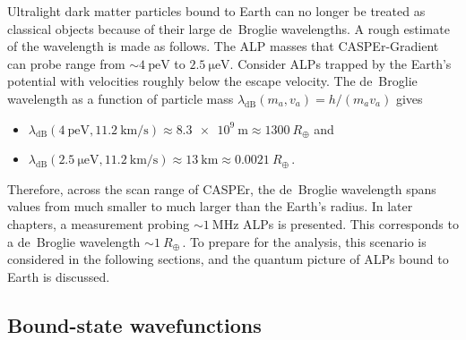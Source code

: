 Ultralight dark matter particles bound to Earth can no longer be treated as classical objects because of their large de~Broglie wavelengths.
A rough estimate of the wavelength is made as follows.
The ALP masses that CASPEr-Gradient can probe range from $\sim\SI{4}{\pico\eV}$ to $\SI{2.5}{\micro\eV}$.
Consider ALPs trapped by the Earth's potential with velocities roughly below the escape velocity.
The de~Broglie wavelength as a function of particle mass $\lambda_\mathrm{dB}(m_a, v_a) = h / (m_a v_a)$ gives\,\cite{Zhang2026_Dissertation_ipynb_2_theory_EH_ALP}
\begin{itemize}
    \item $\lambda_\mathrm{dB}(\SI{4}{\pico\eV}, \SI{11.2}{\km/\second}) \approx \SI{8.3e9}{\m} \approx \SI{1300}{R_\oplus}$ and
    \item $\lambda_\mathrm{dB}(\SI{2.5}{\micro\eV}, \SI{11.2}{\km/\second}) \approx \SI{13}{\km} \approx \SI{0.0021}{R_\oplus}$\,.
\end{itemize}
Therefore, across the scan range of CASPEr, the de~Broglie wavelength spans values from much smaller to much larger than the Earth's radius.
In later chapters, a measurement probing $\sim\SI{1}{\MHz}$ ALPs is presented.
This corresponds to a de~Broglie wavelength $\sim\SI{1}{R_\oplus}$\,\cite{Zhang2026_Dissertation_ipynb_2_theory_EH_ALP}.
To prepare for the analysis, this scenario is considered in the following sections, and the quantum picture of ALPs bound to Earth is discussed.

\subsection{Bound-state wavefunctions}\label{sec:theory:earthALP:wavefunctions}


